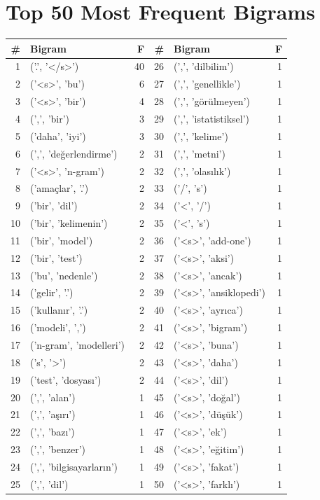 \documentclass[a4paper,10pt]{article}
\begin{document}
\section{Top 50 Most Frequent Bigrams}
\vspace{-2pt}
\begin{center}
\scriptsize
\begin{tabular}{rlr|rlr}
\toprule
\# & Bigram & F & \# & Bigram & F \\
\midrule
1 & ('.', '</s>') & 40 & 26 & (',', 'dilbilim') & 1 \\
2 & ('<s>', 'bu') & 6 & 27 & (',', 'genellikle') & 1 \\
3 & ('<s>', 'bir') & 4 & 28 & (',', 'g\"or\"ulmeyen') & 1 \\
4 & (',', 'bir') & 3 & 29 & (',', 'istatistiksel') & 1 \\
5 & ('daha', 'iyi') & 3 & 30 & (',', 'kelime') & 1 \\
6 & (',', 'de\u{g}erlendirme') & 2 & 31 & (',', 'metni') & 1 \\
7 & ('<s>', 'n-gram') & 2 & 32 & (',', 'olas\i l\i k') & 1 \\
8 & ('ama\c{c}lar', '.') & 2 & 33 & ('/', 's') & 1 \\
9 & ('bir', 'dil') & 2 & 34 & ('<', '/') & 1 \\
10 & ('bir', 'kelimenin') & 2 & 35 & ('<', 's') & 1 \\
11 & ('bir', 'model') & 2 & 36 & ('<s>', 'add-one') & 1 \\
12 & ('bir', 'test') & 2 & 37 & ('<s>', 'aksi') & 1 \\
13 & ('bu', 'nedenle') & 2 & 38 & ('<s>', 'ancak') & 1 \\
14 & ('gelir', '.') & 2 & 39 & ('<s>', 'ansiklopedi') & 1 \\
15 & ('kullan\i r', '.') & 2 & 40 & ('<s>', 'ayr\i ca') & 1 \\
16 & ('modeli', ',') & 2 & 41 & ('<s>', 'bigram') & 1 \\
17 & ('n-gram', 'modelleri') & 2 & 42 & ('<s>', 'buna') & 1 \\
18 & ('s', '>') & 2 & 43 & ('<s>', 'daha') & 1 \\
19 & ('test', 'dosyas\i') & 2 & 44 & ('<s>', 'dil') & 1 \\
20 & (',', 'alan') & 1 & 45 & ('<s>', 'do\u{g}al') & 1 \\
21 & (',', 'a\c{s}\i r\i') & 1 & 46 & ('<s>', 'd\"u\c{s}\"uk') & 1 \\
22 & (',', 'baz\i') & 1 & 47 & ('<s>', 'ek') & 1 \\
23 & (',', 'benzer') & 1 & 48 & ('<s>', 'e\u{g}itim') & 1 \\
24 & (',', 'bilgisayarlar\i n') & 1 & 49 & ('<s>', 'fakat') & 1 \\
25 & (',', 'dil') & 1 & 50 & ('<s>', 'farkl\i') & 1 \\
\bottomrule
\end{tabular}
\end{center}
\vspace{-4pt}
\end{document}
